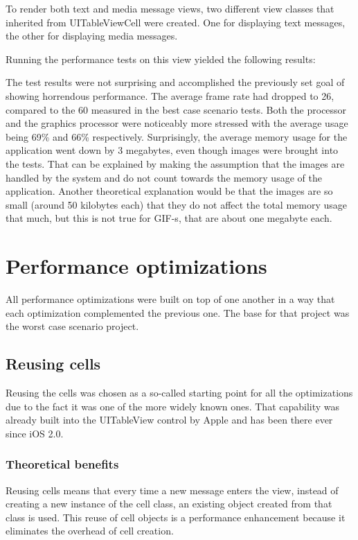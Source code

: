 \documentclass[a4paper,12pt]{article}
\begin{document}
To render both text and media message views, two different view classes that inherited from UITableViewCell were created. One for displaying text messages, the other for displaying media messages.

Running the performance tests on this view yielded the following results:

The test results were not surprising and accomplished the previously set goal of showing horrendous performance. The average frame rate had dropped to 26, compared to the 60 measured in the best case scenario tests. Both the processor and the graphics processor were noticeably more stressed with the average usage being 69\% and 66\% respectively. Surprisingly, the average memory usage for the application went down by 3 megabytes, even though images were brought into the tests. That can be explained by making the assumption that the images are handled by the system and do not count towards the memory usage of the application. Another theoretical explanation would be that the images are so small (around 50 kilobytes each) that they do not affect the total memory usage that much, but this is not true for GIF-s, that are about one megabyte each.

\newpage
\section{Performance optimizations}
All performance optimizations were built on top of one another in a way that each optimization complemented the previous one. The base for that project was the worst case scenario project. 

\subsection{Reusing cells}
Reusing the cells was chosen as a so-called starting point for all the optimizations due to the fact it was one of the more widely known ones. That capability was already built into the UITableView control by Apple and has been there ever since iOS 2.0.\cite{HackingWithSwiftCellReuse}

\subsubsection{Theoretical benefits}
Reusing cells means that every time a new message enters the view, instead of creating a new instance of the cell class, an existing object created from that class is used. This reuse of cell objects is a performance enhancement because it eliminates the overhead of cell creation.\cite{AppleCharacteristicsOfCellObjects}
\end{document}
